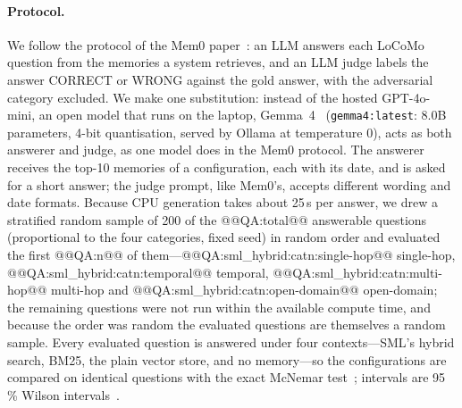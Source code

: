 \documentclass[11pt,a4paper]{article}
\theoremstyle{remark}
\newcommand{\sys}{SML}
\begin{document}
\paragraph{Protocol.} We follow the protocol of the Mem0 paper~\cite{chhikara2025mem0}: an LLM answers each LoCoMo question
from the memories a system retrieves, and an LLM judge labels the answer CORRECT or WRONG against the gold answer, with the
adversarial category excluded. We make one substitution: instead of the hosted GPT-4o-mini, an open model that runs on the
laptop, Gemma~4~\cite{gemma4card} (\texttt{gemma4:latest}: 8.0B parameters, 4-bit quantisation, served by Ollama at
temperature 0), acts as both answerer and judge, as one model does in the Mem0 protocol. The answerer receives the top-10
memories of a configuration, each with its date, and is asked for a short answer; the judge prompt, like Mem0's, accepts
different wording and date formats. Because CPU generation takes about 25\,s per answer, we drew a stratified random
sample of 200 of the @@QA:total@@ answerable questions (proportional to the four categories, fixed seed) in random order and
evaluated the first @@QA:n@@ of them---@@QA:sml_hybrid:catn:single-hop@@ single-hop, @@QA:sml_hybrid:catn:temporal@@
temporal, @@QA:sml_hybrid:catn:multi-hop@@ multi-hop and @@QA:sml_hybrid:catn:open-domain@@ open-domain; the remaining
questions were not run within the available compute time, and because the order was random the evaluated questions are
themselves a random sample. Every evaluated question is answered under four contexts---\sys{}'s hybrid search, BM25, the plain vector store, and no memory---so the
configurations are compared on identical questions with the exact McNemar test~\cite{mcnemar1947}; intervals are 95\,\%
Wilson intervals~\cite{wilson1927}.
\end{document}
